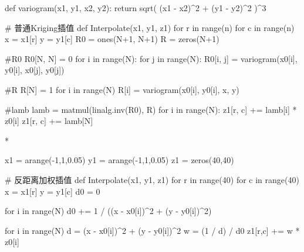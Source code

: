 				\Codes
					def variogram(x1, y1, x2, y2):
						return sqrt( (x1 - x2)^2 + (y1 - y2)^2 )^3

					# 普通Kriging插值
					def Interpolate(x1, y1, z1)
						for r in range(n)
							for c in range(n)
								x = x1[r]
								y = y1[c]
								R0 = ones(N+1, N+1)
								R  = zeros(N+1)

								#R0
								R0[N, N] = 0
								for i in range(N):
									for j in range(N):
										R0[i, j] = variogram(x0[i], y0[i], x0[j], y0[j])

								#R
								R[N] = 1
								for i in range(N)
									R[i] = variogram(x0[i], y0[i], x, y)

								#lamb
								lamb = matmul(linalg.inv(R0), R)
								for i in range(N):
									z1[r, c] += lamb[i] * z0[i]
								z1[r, c] += lamb[N]

		* 
		
			\Codes
				x1 = arange(-1,1,0.05)
				y1 = arange(-1,1,0.05)
				z1 = zeros(40,40)
				
				# 反距离加权插值
				def Interpolate(x1, y1, z1)
					for r in range(40)
						for c in range(40)
							x = x1[r]
							y = y1[c]
							d0 = 0

							for i in range(N)
								d0 += 1 / ((x - x0[i])^2 + (y - y0[i])^2)

							for i in range(N)
								d = (x - x0[i])^2 + (y - y0[i])^2
								w = (1 / d) / d0
								z1[r,c] += w * z0[i]